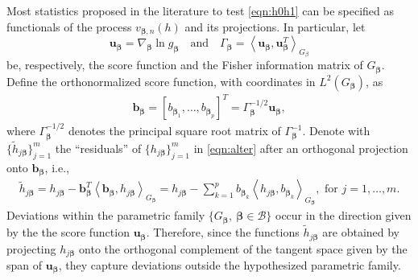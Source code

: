 \documentclass[11pt]{article}
\newcommand{\vect}[1]{\boldsymbol{#1}}
\newcommand{\inner}[1]{\left\langle #1 \right\rangle}
\begin{document}
Most statistics proposed in the literature to test \eqref{eqn:h0h1} can be specified as functionals of the process $v_{\vect{\beta},n}(h)$ and its projections. In particular, let 
$$\bm{u}_{\vect{\beta}}=\nabla_{\vect{\beta}}\ln g_{\vect{\beta}}  \quad \text{and} \quad  \Gamma_{\boldsymbol{\beta}}=\inner{\vect{u}_{\vect{\beta}},\vect{u}^T_{\vect{\beta}}}_{G_{\beta}}$$ be, respectively, the score function and the Fisher information matrix of $G_{\vect{\beta}}$. Define the orthonormalized score function, with coordinates in $L^2(G_{\vect{\beta}})$,  as 
\begin{equation*}
    \begin{aligned}
\vect{b}_{\vect{\beta}} = \left[b_{\vect{\beta}_1}, \ldots, b_{\vect{\beta}_p}\right]^T=\Gamma_{\vect{\beta}}^{-1 / 2} \vect{u}_{\vect{\beta}},
    \end{aligned}
\end{equation*} 
where $\Gamma_{\vect{\beta}}^{-1 / 2}$ denotes the principal square root matrix of $\Gamma_{\vect{\beta}}^{-1}$. 
Denote with $\{\widetilde{h}_{j\vect{\beta}}\}_{j=1}^m$ the ``residuals'' of $\{h_{j\vect{\beta}}\}_{j=1}^m$ in \eqref{eqn:alter} after an orthogonal projection onto $\vect{b}_{\vect{\beta}}$, i.e., 
\begin{equation}
    \begin{aligned}
    \widetilde{h}_{j\vect{\beta}} =  h_{j\vect{\beta}} -\vect{b}^T_{\vect{\beta}}\left\langle \vect{b}_{\vect{\beta}},h_{j\vect{\beta}}\right\rangle_{G_{\vect{\beta}}}
    = h_{j\vect{\beta}} - \sum_{k=1}^p b_{\vect{\beta}_k}\left\langle h_{j\vect{\beta}},b_{\vect{\beta}_k}\right\rangle_{G_{\vect{\beta}}},  \text{ for } j=1,\ldots,m.
    \label{eqn:tildeh}
    \end{aligned}
\end{equation}
Deviations within the parametric family $\{G_{\vect{\beta}}, \ \vect{\beta}\in \mathcal{B}\}$ occur in the direction given by the the score function $\vect{u}_{\vect{\beta}}$. Therefore, since the functions  $\widetilde{h}_{j\vect{\beta}}$ are obtained by projecting $h_{j\vect{\beta}}$ onto the orthogonal complement of the tangent space given by the span of $\vect{u}_{\vect{\beta}}$, they capture deviations outside the hypothesized parametric family. 
\end{document}
